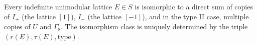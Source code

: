 Every indefinite unimodular lattice $E \in S$ is isomorphic to a direct sum of copies of $I_+$ (the lattice $[1]$), $I_-$ (the lattice $[-1]$), and in the type II case, multiple copies of $U$ and $\Gamma_8$. The isomorphism class is uniquely determined by the triple $(r(E), \tau(E), \text{type})$.
